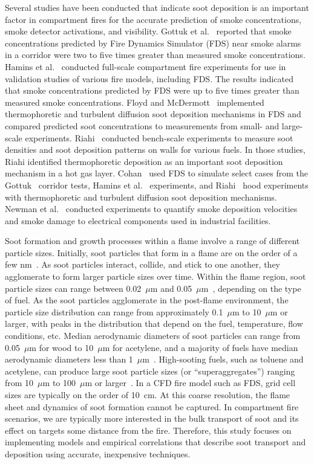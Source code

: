 Several studies have been conducted that indicate soot deposition is an important factor in compartment fires for the accurate prediction of smoke concentrations, smoke detector activations, and visibility. Gottuk et al.~\cite{Gottuk:IAFSS2008} reported that smoke concentrations predicted by Fire Dynamics Simulator (FDS) near smoke alarms in a corridor were two to five times greater than measured smoke concentrations. Hamins et al.~\cite{Hamins:SP1013-1} conducted full-scale compartment fire experiments for use in validation studies of various fire models, including FDS. The results indicated that smoke concentrations predicted by FDS were up to five times greater than measured smoke concentrations. Floyd and McDermott~\cite{Floyd:Interflam2010} implemented thermophoretic and turbulent diffusion soot deposition mechanisms in FDS and compared predicted soot concentrations to measurements from small- and large-scale experiments. Riahi~\cite{riahi2013wall} conducted bench-scale experiments to measure soot densities and soot deposition patterns on walls for various fuels. In those studies, Riahi identified thermophoretic deposition as an important soot deposition mechanism in a hot gas layer. Cohan~\cite{Cohan:Masters} used FDS to simulate select cases from the Gottuk~\cite{Gottuk:IAFSS2008} corridor tests, Hamins et al.~\cite{Hamins:SP1013-1} experiments, and Riahi~\cite{riahi2013wall} hood experiments with thermophoretic and turbulent diffusion soot deposition mechanisms. Newman et al.~\cite{newmansmoke} conducted experiments to quantify smoke deposition velocities and smoke damage to electrical components used in industrial facilities.

Soot formation and growth processes within a flame involve a range of different particle sizes. Initially, soot particles that form in a flame are on the order of a few nm~\cite{kennedy1997models}. As soot particles interact, collide, and stick to one another, they agglomerate to form larger particle sizes over time. Within the flame region, soot particle sizes can range between 0.02~$\mu$m and 0.05~$\mu$m~\cite{Butler:2004p433}, depending on the type of fuel. As the soot particles agglomerate in the post-flame environment, the particle size distribution can range from approximately 0.1~$\mu$m to 10~$\mu$m or larger, with peaks in the distribution that depend on the fuel, temperature, flow conditions, etc. Median aerodynamic diameters of soot particles can range from 0.05~$\mu$m for wood to 10~$\mu$m for acetylene, and a majority of fuels have median aerodynamic diameters less than 1~$\mu$m~\cite{Butler:2004p433}. High-sooting fuels, such as toluene and acetylene, can produce large soot particle sizes (or ``superaggregates'') ranging from 10~$\mu$m to 100~$\mu$m or larger~\cite{PhysRevLett.80.1782,doi:10.1021/la034063h,Kearney20123191}. In a CFD fire model such as FDS, grid cell sizes are typically on the order of 10~cm. At this coarse resolution, the flame sheet and dynamics of soot formation cannot be captured. In compartment fire scenarios, we are typically more interested in the bulk transport of soot and its effect on targets some distance from the fire. Therefore, this study focuses on implementing models and empirical correlations that describe soot transport and deposition using accurate, inexpensive techniques.


